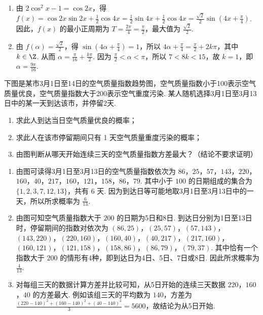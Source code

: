 \begin{solution}
\begin{enumerate}
\item 由 \(2\cos^2 x-1=\cos 2x\)，得
\(f(x)=\cos 2x\sin 2x+\frac{1}{2}\cos 4x=\frac{1}{2}\sin 4x+\frac{1}{2}\cos 4x=\frac{\sqrt{2}}{2}\sin\left(4x+\frac{\pi}{4}\right)\).
因此，\(f(x)\) 的最小正周期为 \(T=\frac{2\pi}{4}=\frac{\pi}{2}\)，最大值为 \(\frac{\sqrt{2}}{2}\).
\item 由 \(f(\alpha)=\frac{\sqrt{2}}{2}\)，得 \(\sin\left(4\alpha+\frac{\pi}{4}\right)=1\)，所以 \(4\alpha+\frac{\pi}{4}=\frac{\pi}{2}+2k\pi\)，其中 \(k\in\Z\). 从而 \(\alpha=\frac{\pi}{16}+\frac{k\pi}{2}\). 因为 \(\frac{\pi}{2}<\alpha<\pi\)，所以 \(7<8k<15\)，故 \(k=1\)，即 \(\alpha=\frac{9\pi}{16}\).
\end{enumerate}
\end{solution}

\begin{problem}
下图是某市3月1日至14日的空气质量指数趋势图，空气质量指数小于100表示空气质量优良，空气质量指数大于200表示空气重度污染. 某人随机选择3月1日至3月13日中的某一天到达该市，并停留2天.

\begin{enumerate}
\item 求此人到达当日空气质量优良的概率；
\item 求此人在该市停留期间只有 1 天空气质量重度污染的概率；
\item 由图判断从哪天开始连续三天的空气质量指数方差最大？（结论不要求证明）
\end{enumerate}

\end{problem}

\begin{solution}
\begin{enumerate}
\item 由图可读得3月1日至3月13日的空气质量指数依次为 \(86\)，\(25\)，\(57\)，\(143\)，\(220\)，\(160\)，\(40\)，\(217\)，\(160\)，\(121\)，\(158\)，\(86\)，\(79\). 其中小于 \(100\) 的日期组成的集合为 \(\{1,2,3,7,12,13\}\)，共有 \(6\) 天. 因为到达日等可能地取3月1日至3月13日中的一天，所以所求概率为 \(\frac{6}{13}\).
\item 由图可知空气质量指数大于 \(200\) 的日期为5日和8日. 到达日分别为1日至13日时，停留期间的指数对依次为 \((86,25)\)，\((25,57)\)，\((57,143)\)，\((143,220)\)，\((220,160)\)，\((160,40)\)，\((40,217)\)，\((217,160)\)，\((160,121)\)，\((121,158)\)，\((158,86)\)，\((86,79)\)，\((79,37)\). 其中恰有一个指数大于 \(200\) 的情形有4种，即到达日为4日、5日、7日或8日. 因此所求概率为 \(\frac{4}{13}\).
\item 对每组三天的数据计算方差并比较可知，从5日开始的连续三天数据 \(220\)，\(160\)，\(40\) 的方差最大. 例如该组三天的平均数为 \(140\)，方差为 \(\frac{(220-140)^2+(160-140)^2+(40-140)^2}{3}=5600\)，故结论为从5日开始.
\end{enumerate}
\end{solution}

